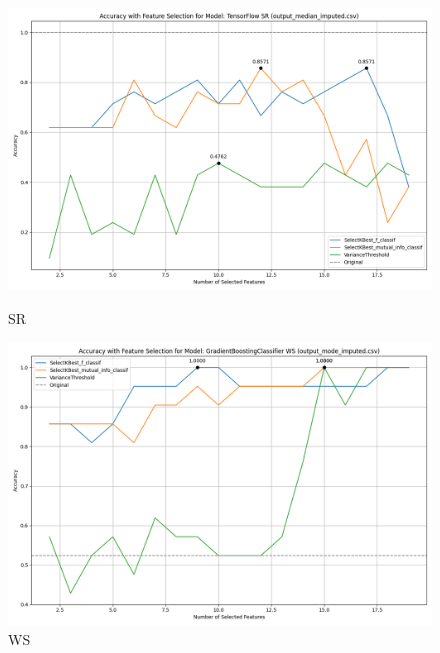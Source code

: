 \begin{figure}[H]
    \centering
    \begin{minipage}[b]{0.45\textwidth}
        \includegraphics[width=\textwidth]{class_specific_section/images_class_ensemble_reduction/feature_selection_accuracy_plot_output_median_imputedcsv_TensorFlow_SR.png}
        \caption{SR}
        \label{fig_class_spec:sr_featred_graph}
    \end{minipage}
    \hfill
    \begin{minipage}[b]{0.45\textwidth}
        \includegraphics[width=\textwidth]{class_specific_section/images_class_ensemble_reduction/feature_selection_accuracy_plot_output_mode_imputedcsv_GradientBoostingClassifier_WS.png}
        \caption{WS}
        \label{fig_class_spec:ws_featred_graph}
    \end{minipage}
\end{figure}

